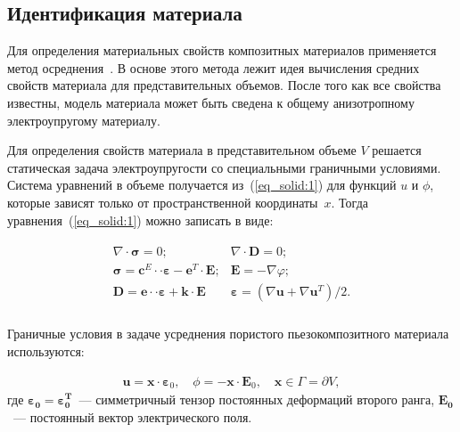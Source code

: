 \subsection{Идентификация материала}

Для определения материальных свойств композитных материалов применяется метод осреднения~\cite{Do2023}. В основе этого метода лежит идея вычисления средних свойств материала для представительных объемов. После того как все свойства известны, модель материала может быть сведена к общему анизотропному электроупругому материалу.


Для определения свойств материала в представительном объеме $V$ решается статическая задача электроупругости со специальными граничными условиями.
Система уравнений в объеме получается из~(\ref{eq_solid:1}) для функций $u$ и $\phi$, которые зависят только от пространственной координаты~$x$. Тогда уравнения~(\ref{eq_solid:1}) можно записать в виде:

\begin{equation} \label{eq_solid:2}  
	\begin{aligned}
	\begin{array}{ll} 
		\nabla \cdot \boldsymbol{\sigma} =0; & \nabla \cdot \boldsymbol{D}={0};\\ 
		\boldsymbol{\sigma} =\boldsymbol{c}^{E} \cdot \cdot \boldsymbol{\varepsilon}-\boldsymbol{e}^{T} \cdot \boldsymbol{E}; & \boldsymbol{E}=-\nabla \varphi;\\
		\boldsymbol{D} =\boldsymbol{e} \cdot \cdot  \boldsymbol{\varepsilon}+\boldsymbol{k} \cdot \boldsymbol{E} & \boldsymbol{\varepsilon} =(\nabla \boldsymbol{u}+\nabla \boldsymbol{u}^{T} )/2.\\
	\end{array} 
\end{aligned} 
\end{equation}

Граничные условия в задаче усреднения  пористого пьезокомпозитного материала~\cite{Mawassy2021} используются:  

\begin{equation}\label{eq_solid:3} 
	\begin{aligned}
	\boldsymbol{u}=\boldsymbol{x} \cdot \boldsymbol{\varepsilon}_0, \quad \phi=-\boldsymbol{x} \cdot \boldsymbol{E}_0, \quad \boldsymbol{x} \in \Gamma=\partial V,
\end{aligned} 
\end{equation}
где $\boldsymbol{\varepsilon_0}=\boldsymbol{\varepsilon_0^T}$~--- симметричный тензор постоянных деформаций второго ранга, $\boldsymbol{E_0}$~--- постоянный вектор электрического поля.

